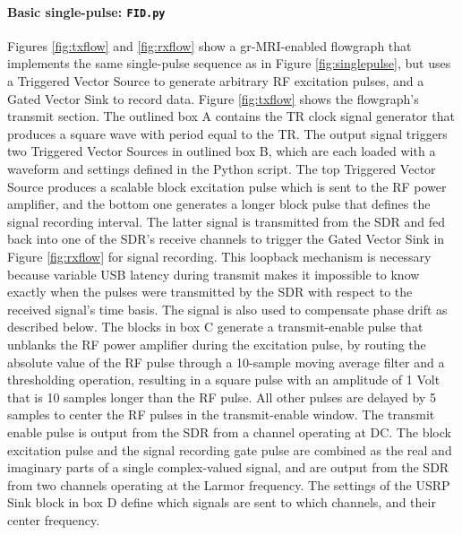 \documentclass[10pt,letterpaper]{article}
\begin{document}
\paragraph{Basic single-pulse: \texttt{FID.py}} Figures \ref{fig:txflow} and \ref{fig:rxflow} show a gr-MRI-enabled 
flowgraph that implements the same single-pulse sequence as in Figure \ref{fig:singlepulse}, 
but uses a Triggered Vector Source to generate arbitrary RF excitation pulses,
and a Gated Vector Sink to record data. 
Figure \ref{fig:txflow} shows the flowgraph's transmit section.  
The outlined box A contains the TR clock signal generator that produces a square wave with period equal to the TR.  
The output signal triggers two Triggered Vector Sources in outlined box B, 
which are each loaded with a waveform and settings defined in the 
Python script.
The top Triggered Vector Source produces a scalable block excitation pulse which is sent to the RF power amplifier, 
and the bottom one generates a longer block pulse that defines the signal recording interval.  
The latter signal is transmitted from the SDR and fed back into one of the SDR's receive channels to trigger the Gated Vector Sink in Figure \ref{fig:rxflow} for signal recording.  
This loopback mechanism is necessary because variable USB latency during transmit makes it impossible to know exactly when 
the pulses were transmitted by the SDR with respect to the received signal's time basis.
The signal is also used to compensate phase drift as described below.
The blocks in box C generate a transmit-enable pulse that unblanks the RF power amplifier during the excitation pulse,
by routing the absolute value of the RF pulse through a 10-sample moving average filter and a thresholding operation, 
resulting in a square pulse with an amplitude of 1 Volt that is 10 samples longer than the RF pulse. 
All other pulses are delayed by 5 samples to center the RF pulses in the transmit-enable window.
The transmit enable pulse is output from the SDR from a channel operating at DC.  
The block excitation pulse and the signal recording gate pulse are combined as the real and imaginary parts of 
a single complex-valued signal, and are output from the SDR from two channels operating at the Larmor frequency.
The settings of the USRP Sink block in box D define which signals are sent to which channels, and their center frequency.
\end{document}
